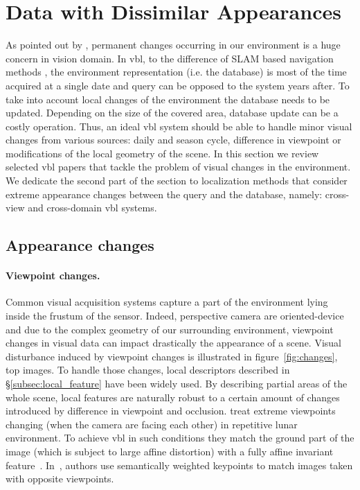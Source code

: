\section{Data with Dissimilar Appearances}
\label{sec:changing_environment}	

	

	As pointed out by \citet{Lowry2016}, permanent changes occurring in our environment is a huge concern in vision domain. In \ac{vbl}, to the difference of SLAM based navigation methods \citep{Garcia-Fidalgo2015,Lowry2016}, the environment representation (i.e. the database) is most of the time acquired at a single date and query can be opposed to the system years after. To take into account local changes of the environment the database needs to be updated. Depending on the size of the covered area, database update can be a costly operation. Thus, an ideal \ac{vbl} system should be able to handle minor visual changes from various sources: daily and season cycle, difference in viewpoint or modifications of the local geometry of the scene. In this section we review selected \ac{vbl} papers that tackle the problem of visual changes in the environment. We dedicate the second part of the section to localization methods that consider extreme appearance changes between the query and the database, namely: cross-view and cross-domain \ac{vbl} systems.
	
	\subsection{Appearance changes}
	\label{subsec:appearance}
		\paragraph{Viewpoint changes.}
			\label{para:viewpoint}
			Common visual acquisition systems capture a part of the environment lying inside the frustum of the sensor. Indeed, perspective camera are oriented-device and due to the complex geometry of our surrounding environment, viewpoint changes in visual data can impact drastically the appearance of a scene. Visual disturbance induced by viewpoint changes is illustrated in figure~\ref{fig:changes}, top images. To handle those changes, local descriptors described in \S\ref{subsec:local_feature} have been widely used. By describing partial areas of the whole scene, local features are naturally robust to a certain amount of changes introduced by difference in viewpoint and occlusion. \citet{Wan2014} treat extreme viewpoints changing (when the camera are facing each other) in repetitive lunar environment. To achieve \ac{vbl} in such conditions they match the ground part of the image (which is subject to large affine distortion) with a fully affine invariant feature~\citep{Morel2009}. In~\citep{Garg2018a}, authors use semantically weighted keypoints to match images taken with opposite viewpoints.
			
